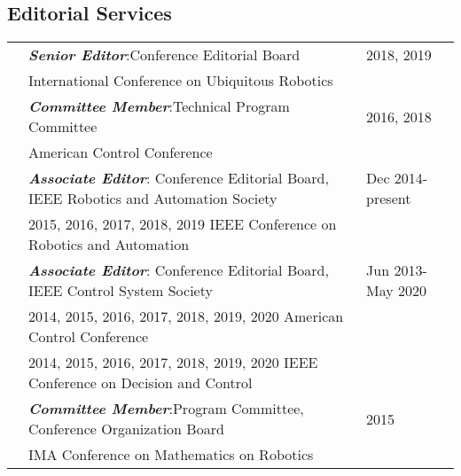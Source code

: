 \documentclass[10pt]{article}
\begin{document}
\vspace*{0.2cm}

\newcommand{\bfi}[1]{\textbf{\textit{#1}}}

\subsection*{Editorial Services}
\begin{tabularx}{\textwidth}{>{\setlength{\hsize}{0.5cm}}X%
>{\setlength{\hsize}{14.3cm}}X%
>{\hfill}X}

& \bfi{Senior Editor}:\quad Conference Editorial Board \quad  & 2018, 2019\\
& International Conference on Ubiquitous Robotics & \\[0.2cm]

& \bfi{Committee Member}:\quad Technical Program Committee \quad  & 2016, 2018\\
& American Control Conference & \\[0.2cm]

&\bfi{Associate Editor}: Conference Editorial Board, IEEE Robotics and Automation Society & Dec 2014-present \\
& 2015, 2016, 2017, 2018, 2019 IEEE Conference on Robotics and Automation& \\[0.2cm]

&\bfi{Associate Editor}: Conference Editorial Board, IEEE Control System Society & Jun 2013-May 2020 \\
& 2014, 2015, 2016, 2017, 2018, 2019, 2020 American Control Conference& \\
& 2014, 2015, 2016, 2017, 2018, 2019, 2020 IEEE Conference on Decision and Control& \\[0.2cm]

& \bfi{Committee Member}:\quad Program Committee, Conference Organization Board\quad  & 2015\\
& IMA Conference on Mathematics on Robotics & \\[0.2cm]

\end{tabularx}

\vspace*{0.2cm}

\clearpage\newpage
\end{document}
